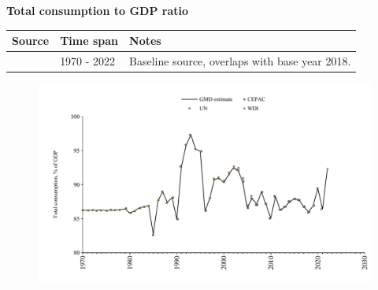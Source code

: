 \documentclass[12pt,a4paper,landscape]{article}
\begin{document}
\begin{adjustbox}{max totalsize={\paperwidth}{\paperheight},center}
\begin{minipage}[t][\textheight][t]{\textwidth}
\vspace*{0.5cm}
{}
\begin{center}
{\Large\bfseries Total consumption to GDP ratio}
\end{center}
\vspace{0.5cm}
\begin{table}[H]
\centering
\small
\begin{tabular}{|l|l|l|}
\hline
\textbf{Source} & \textbf{Time span} & \textbf{Notes} \\
\hline
\rowcolor{white}\cite{WDI}& 1970 - 2022 &Baseline source, overlaps with base year 2018. \\
\hline
\end{tabular}
\end{table}
\begin{figure}[H]
\centering
\includegraphics[width=\textwidth,height=0.6\textheight,keepaspectratio]{graphs/CUB_cons_GDP.pdf}
\end{figure}
\end{minipage}
\end{adjustbox}
\end{document}
